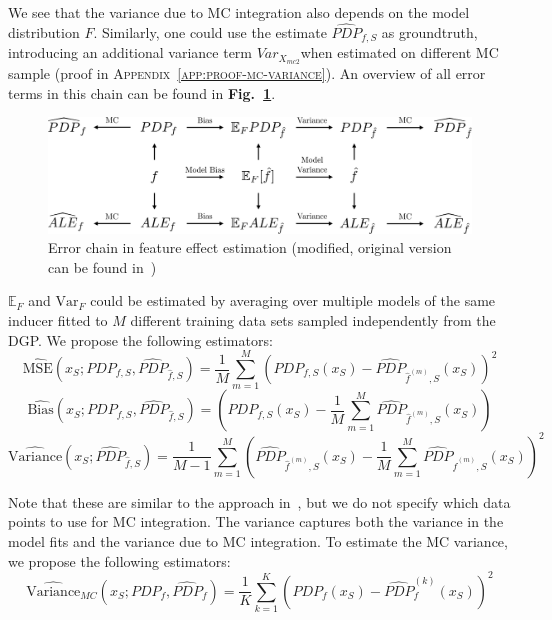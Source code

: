 \documentclass[runningheads]{llncs}
\begin{document}
\noindent We see that the variance due to MC integration also depends on the model
distribution $F$. Similarly, one could use the estimate $\widehat{PDP}_{f,S}$
as groundtruth, introducing an additional variance term $Var_{X_{mc2}}$when
estimated on different MC sample (proof in
\textsc{Appendix~\ref{app:proof-mc-variance}}).
An overview of all error terms in this chain can be found in
\textbf{Fig.\@~\ref{fig:error-graph}}.\\

\begin{figure}[t]
    \includegraphics[width=\textwidth]{img/error_graph.pdf}
    \caption{Error chain in feature effect estimation
        (modified, original version can be found in~\cite{molnar_relating_2023})}\label{fig:error-graph}
\end{figure}

\noindent $\mathbb{E}_F$ and $\text{Var}_F$ could be estimated by averaging over
multiple models of the same inducer fitted to $M$ different training data
sets sampled independently from the DGP. We propose the following estimators:
\begin{equation}
    \widehat{\text{MSE}}(x_S; PDP_{f,S}, \widehat{PDP}_{\hat f,S}) = \frac{1}{M} \sum_{m=1}^{M} {(PDP_{f,S}(x_S) - \widehat{PDP}_{\hat f^{(m)},S}(x_S))}^2
    \label{eq:mse-estimator}
\end{equation}
\begin{equation}
    \widehat{\text{Bias}}(x_S; PDP_{f,S}, \widehat{PDP}_{\hat f,S}) = (PDP_{f,S}(x_S) - \frac{1}{M}\sum_{m=1}^M \widehat{PDP}_{\hat{f}^{(m)},S}(x_S))
    \label{eq:bias-estimator}
\end{equation}
\begin{equation}
    \widehat{\text{Variance}}(x_S; \widehat{PDP}_{\hat f,S}) =
    \frac{1}{M-1}\sum_{m=1}^M\left(\widehat{PDP}_{\hat f^{(m)},S}(x_S) - \frac{1}{M}\sum_{m=1}^M \widehat{PDP}_{\hat f^{(m)},S}(x_S)\right)^2
    \label{eq:variance-estimator}
\end{equation}

\noindent Note that these are similar to the approach in~\cite{molnar_relating_2023},
but we do not specify which data points to use for MC integration. The
variance captures both the variance in the model fits and the variance due to
MC integration. To estimate the MC variance, we propose the following estimators:
\begin{equation}
    \widehat{\text{Variance}}_{MC}(x_S; PDP_f, \widehat{PDP}_f) = \frac{1}{K}\sum_{k=1}^K(PDP_f(x_S) - \widehat{PDP}_f^{(k)}(x_S))^2
    \label{eq:mc-variance-estimator-groundtruth}
\end{equation}
\end{document}
